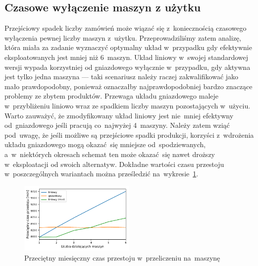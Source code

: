 \documentclass[12pt, a4paper, oneside]{mwart} %
\begin{document}
\subsection{Czasowe wyłączenie maszyn z użytku}
Przejściowy spadek liczby zamówień może wiązać się z~koniecznością czasowego wyłączenia pewnej liczby maszyn z~użytku. Przeprowadziliśmy zatem analizę, która miała za zadanie wyznaczyć optymalny układ w~przypadku gdy efektywnie eksploatowanych jest mniej niż 6~maszyn. Układ liniowy w~swojej standardowej wersji wypada korzystniej od gniazdowego wyłącznie w~przypadku, gdy aktywna jest tylko jedna maszyna --- taki scenariusz należy raczej zakwalifikować jako mało prawdopodobny, ponieważ oznaczałby najprawdopodobniej bardzo znaczące problemy ze zbytem produktów. Przewaga układu gniazdowego maleje w~przybliżeniu liniowo wraz ze spadkiem liczby maszyn pozostających w~użyciu. Warto zauważyć, że zmodyfikowany układ liniowy jest nie~mniej efektywny od~gniazdowego jeśli pracują co~najwyżej 4~maszyny. Należy zatem wziąć pod~uwagę, że jeśli możliwe są przejściowe spadki produkcji, korzyści z~wdrożenia układu gniazdowego mogą okazać~się mniejsze od~spodziewanych, a~w~niektórych okresach schemat ten może okazać~się nawet droższy w~eksploatacji od swoich alternatyw. Dokładne wartości czasu przestoju w~poszczególnych wariantach można prześledzić na~wykresie~\ref{wyk_recesja}.
\begin{figure}
\centering
\caption{Przeciętny miesięczny czas przestoju w~przeliczeniu na~maszynę}
\label{wyk_recesja}
\includegraphics[width = 0.5\textwidth]{wykresy/recesja.pdf}
\end{figure}
\end{document}
